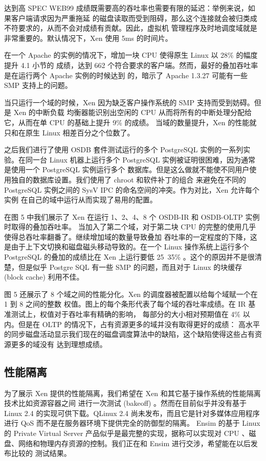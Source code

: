 达到高 SPEC WEB99 成绩既需要高的吞吐率也需要有限的延迟：举例来说，如果客户端请求因为严重拖延
的磁盘读取而受到阻碍，那么这个连接就会被归类成不符要求的，从而不会对成绩有贡献。因此，虚拟机
管理程序及时地调度域就是非常重要的。默认情况下，Xen 使用 5ms 的时间片。

在一个 Apache 的实例的情况下，增加一块 CPU 使得原生 Linux 以 28\% 的幅度提升 4.1 小节的
成绩，达到 662 个符合要求的客户端。然而，最好的叠加吞吐率是在运行两个 Apache 实例的时候达到
的，暗示了 Apache 1.3.27 可能有一些 SMP 支持上的问题。

当只运行一个域的时候，Xen 因为缺乏客户操作系统的 SMP 支持而受到妨碍。但是 Xen 的中断负载
均衡器能识别出空闲的 CPU 从而将所有的中断处理分配给它，从而在单 CPU 的基础上提升 9\% 的成绩。
当域的数量提升，Xen 的性能就只和在原生 Linux 相差百分之个位数了。

之后我们进行了使用 OSDB 套件测试运行的多个 PostgreSQL 实例的一系列实验。在同一台 Linux
机器上运行多个 PostgreSQL 实例被证明很困难，因为通常是使用一个 PostgreSQL 实例运行多个
数据库。但是这么做就不能使不同用户使用独自的数据库设置。我们使用了 chroot 和软件补丁的组合
来避免在不同的 PostgreSQL 实例之间的 SysV IPC 的命名空间的冲突。作为对比，Xen 允许每个实例
在自己的域中运行从而实现了易用的配置。

在图 5 中我们展示了 Xen 在运行 1、2、4、8 个 OSDB-IR 和 OSDB-OLTP 实例时取得的叠加吞吐率。
当加入了第二个域，对于第二块 CPU 的完整的使用几乎使得总吞吐率翻番了。继续增加域的数量导致叠加
吞吐率的一定程度的下降，这是由于上下文切换和磁盘磁头移动导致的。在一个 Linux 操作系统上运行多个
PostgreSQL 的叠加的成绩比在 Xen 上运行要低 25~35\% 。这个的原因并不是很清楚，但是似乎
Postgre SQL 有一些 SMP 的问题，而且对于 Linux 的块缓存 (block cache) 利用不佳。

图 5 还展示了 8 个域之间的性能分化。Xen 的调度器被配置以给每个域赋一个在 1 到 8 之间的整数
权值。图上的每个条形代表了每个域的吞吐率成绩。在 IR 基准测试上，权值对于吞吐率有精确的影响，
每部分的大小相对预期值在 4\% 以内。但是在 OLTP 的情况下，占有资源更多的域并没有取得更好的成绩：
高水平的同步磁盘活动显示我们现在的磁盘调度算法中的缺陷，这个缺陷使得这些占有资源更多的域没有
达到理想成绩。

\subsection{性能隔离}

为了展示 Xen 提供的性能隔离，我们希望在 Xen 和其它基于操作系统的性能隔离技术比如资源容器之间
进行一次测试 (bakeoff) 。然而在目前似乎并没有基于 Linux 2.4 的实现可供下载。QLinux 2.4
尚未发布，而且它是针对多媒体应用程序进行 QoS 而不是在服务器环境下提供完全的防御型的隔离。
Ensim 的基于 Linux 的 Private Virtual Server 产品似乎是最完整的实现，据称可以实现对
CPU 、磁盘、网络和物理内存资源的控制。我们正在和 Ensim 进行交涉，希望能在以后发布比较的
测试结果。

